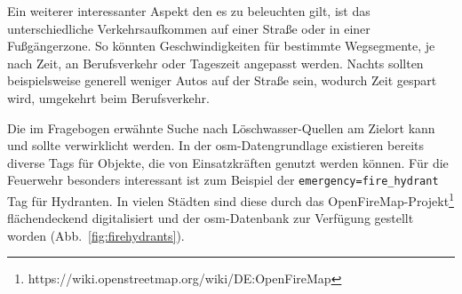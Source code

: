 Ein weiterer interessanter Aspekt den es zu beleuchten gilt, ist das unterschiedliche Verkehrsaufkommen auf einer Straße oder in einer Fußgängerzone.
So könnten Geschwindigkeiten für bestimmte Wegsegmente, je nach Zeit, an Berufsverkehr oder Tageszeit angepasst werden.
Nachts sollten beispielsweise generell weniger Autos auf der Straße sein, wodurch Zeit gespart wird, umgekehrt beim Berufsverkehr.

Die im Fragebogen erwähnte Suche nach Löschwasser-Quellen am Zielort kann und sollte verwirklicht werden.
In der \gls{osm}-Datengrundlage existieren bereits diverse Tags für Objekte, die von Einsatzkräften genutzt werden können.
Für die Feuerwehr besonders interessant ist zum Beispiel der \texttt{emergency=fire\_hydrant} Tag für Hydranten.
In vielen Städten sind diese durch das OpenFireMap-Projekt\footnote{https://wiki.openstreetmap.org/wiki/DE:OpenFireMap} flächendeckend digitalisiert und der \gls{osm}-Datenbank zur Verfügung gestellt worden (Abb.~\ref{fig:firehydrants}).